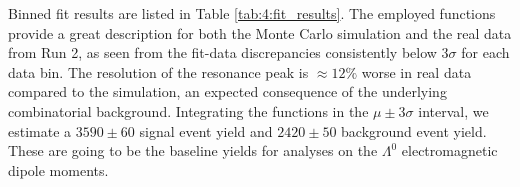 Binned fit results are listed in Table \ref{tab:4:fit_results}.
The employed functions provide a great description for both the Monte Carlo simulation and the real data from Run 2, as seen from the fit-data discrepancies consistently below $3\sigma$ for each data bin.
The resolution of the resonance peak is $\approx 12\%$ worse in real data compared to the simulation, an expected consequence of the underlying combinatorial background.
Integrating the functions in the $\mu \pm 3\sigma$ interval, we estimate a $3590 \pm 60$ signal event yield and $2420 \pm 50$ background event yield.
These are going to be the baseline yields for analyses on the $\Lambda^0$ electromagnetic dipole moments.
